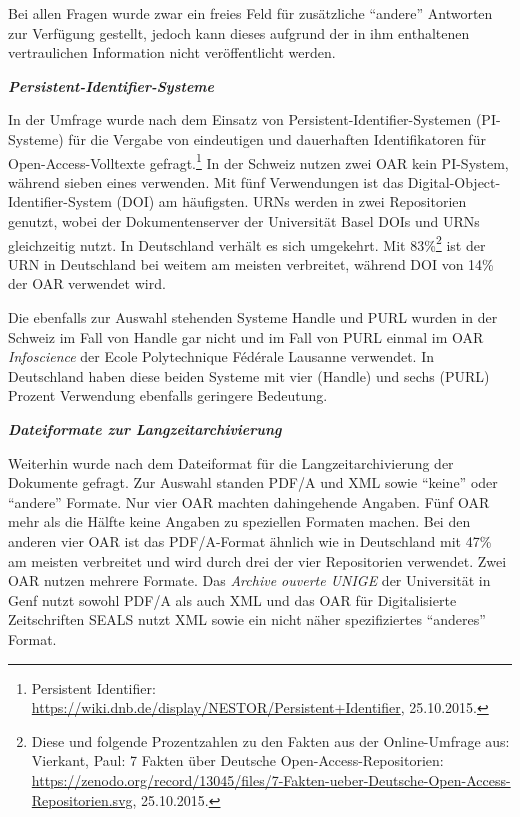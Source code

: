 \documentclass[a4paper,
fontsize=11pt,
oneside,
numbers=noperiodatend,
parskip=half-,
bibliography=totoc,
final
]{scrartcl}
\begin{document}
Bei allen Fragen wurde zwar ein freies Feld für zusätzliche
\enquote{andere} Antworten zur Verfügung gestellt, jedoch kann dieses
aufgrund der in ihm enthaltenen vertraulichen Information nicht
veröffentlicht werden.

\textbf{\emph{Persistent-Identifier-Systeme }}

In der Umfrage wurde nach dem Einsatz von Persistent-Identifier-Systemen
(PI-Systeme) für die Vergabe von eindeutigen und dauerhaften
Identifikatoren für Open-Access-Voll\-texte gefragt.\footnote{Persistent
  Identifier:
  \url{https://wiki.dnb.de/display/NESTOR/Persistent+Identifier},
  25.10.2015.} In der Schweiz nutzen zwei OAR kein PI-System, während
sieben eines verwenden. Mit fünf Verwendungen ist das
Digital-Object-Identifier-System (DOI) am häufigsten. URNs werden in
zwei Repositorien genutzt, wobei der Dokumentenserver der Universität
Basel DOIs und URNs gleichzeitig nutzt. In Deutschland verhält es sich
umgekehrt. Mit 83\%\footnote{Diese und folgende Prozentzahlen zu den
  Fakten aus der Online-Umfrage aus: Vierkant, Paul: 7 Fakten über
  Deutsche Open-Access-Repositorien:
  \url{https://zenodo.org/record/13045/files/7-Fakten-ueber-Deutsche-Open-Access-Repositorien.svg},
  25.10.2015.} ist der URN in Deutschland bei weitem am meisten
verbreitet, während DOI von 14\% der OAR verwendet wird.

Die ebenfalls zur Auswahl stehenden Systeme Handle und PURL wurden in
der Schweiz im Fall von Handle gar nicht und im Fall von PURL einmal im
OAR \emph{Infoscience} der Ecole Polytechnique Fédérale Lausanne
verwendet. In Deutschland haben diese beiden Systeme mit vier (Handle)
und sechs (PURL) Prozent Verwendung ebenfalls geringere Bedeutung.

\textbf{\emph{Dateiformate zur Langzeitarchivierung }}

Weiterhin wurde nach dem Dateiformat für die Langzeitarchivierung der
Dokumente gefragt. Zur Auswahl standen PDF/A und XML sowie
\enquote{keine} oder \enquote{andere} Formate. Nur vier OAR machten
dahingehende Angaben. Fünf OAR mehr als die Hälfte keine Angaben zu
speziellen Formaten machen. Bei den anderen vier OAR ist das
PDF/A-Format ähnlich wie in Deutschland mit 47\% am meisten verbreitet
und wird durch drei der vier Repositorien verwendet. Zwei OAR nutzen
mehrere Formate. Das \emph{Archive ouverte UNIGE} der Universität in
Genf nutzt sowohl PDF/A als auch XML und das OAR für Digitalisierte
Zeitschriften SEALS nutzt XML sowie ein nicht näher spezifiziertes
\enquote{anderes} Format.
\end{document}
